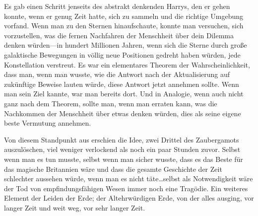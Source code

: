 Es gab einen Schritt jenseits des abstrakt denkenden Harrys, den er gehen konnte, wenn er genug Zeit hatte, sich zu sammeln und die richtige Umgebung vorfand. Wenn man zu den Sternen hinaufschaute, konnte man versuchen, sich vorzustellen, was die fernen Nachfahren der Menschheit über dein Dilemma denken würden—in hundert Millionen Jahren, wenn sich die Sterne durch große galaktische Bewegungen in völlig neue Positionen gedreht haben würden, jede Konstellation verstreut. Es war ein elementares Theorem der Wahrscheinlichkeit, dass man, wenn man wusste, wie die Antwort nach der Aktualisierung auf zukünftige Beweise lauten würde, diese Antwort jetzt annehmen sollte. Wenn man sein Ziel kannte, war man bereits dort. Und in Analogie, wenn auch nicht ganz nach dem Theorem, sollte man, wenn man erraten kann, was die Nachkommen der Menschheit über etwas denken würden, dies als seine eigene beste Vermutung annehmen.

Von diesem Standpunkt aus erschien die Idee, zwei Drittel des Zaubergamots auszulöschen, viel weniger verlockend als noch ein paar Stunden zuvor. Selbst wenn man es tun musste, selbst wenn man sicher wusste, dass es das Beste für das magische Britannien wäre und dass die gesamte Geschichte der Zeit schlechter aussehen würde, wenn man es nicht täte…selbst als Notwendigkeit wäre der Tod von empfindungsfähigen Wesen immer noch eine Tragödie. Ein weiteres Element der Leiden der Erde; der Altehrwürdigen Erde, von der alles ausging, vor langer Zeit und weit weg, vor sehr langer Zeit.

